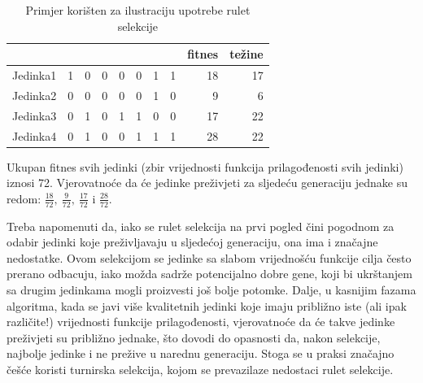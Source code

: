 \documentclass[a4paper, utf8, 11pt, colorlinks]{book}
\theoremstyle{definition}
\begin{document}
\begin{table}
	\centering
	\begin{tabular}{l|rrrrrrrrr}
		& \multicolumn{1}{l}{} & \multicolumn{1}{l}{} & \multicolumn{1}{l}{} & \multicolumn{1}{l}{} & \multicolumn{1}{l}{} & \multicolumn{1}{l}{} & \multicolumn{1}{l}{} & \multicolumn{1}{l}{fitnes} & \multicolumn{1}{l}{težine}  \\\hline
		Jedinka1 & 1                    & 0                    & 0                    & 0                    & 0                    & 1                    & 1                    & 18                         & 17                          \\
		Jedinka2 & 0                    & 0                    & 0                    & 0                    & 0                    & 1                    & 0                    & 9                          & 6                           \\
		Jedinka3 & 0                    & 1                    & 0                    & 1                    & 1                    & 0                    & 0                    & 17                         & 22                          \\
		Jedinka4 & 0                    & 1                    & 0                    & 0                    & 1                    & 1                    & 1                    & 28                         & 22      \\\hline                   
	\end{tabular}\caption{Primjer korišten za ilustraciju upotrebe rulet selekcije}
	\label{tab:rulet}
\end{table}
Ukupan fitnes svih jedinki (zbir vrijednosti funkcija prilagođenosti svih jedinki) iznosi 72. Vjerovatnoće da će jedinke preživjeti za sljedeću generaciju jednake su redom: $\frac{18}{72},\ \frac{9}{72},\ \frac{17}{72}$ i $\frac{28}{72}$. 

Treba napomenuti da, iako se rulet selekcija na prvi pogled čini pogodnom za odabir jedinki koje preživljavaju u sljedećoj generaciju, ona ima i značajne nedostatke. Ovom selekcijom se jedinke sa slabom vrijednošću funkcije cilja često prerano odbacuju, iako možda sadrže potencijalno dobre gene, koji bi ukrštanjem sa drugim jedinkama mogli proizvesti još bolje potomke. Dalje, u kasnijim fazama algoritma, kada se javi više kvalitetnih jedinki koje imaju približno iste (ali ipak različite!) vrijednosti funkcije prilagođenosti, vjerovatnoće da će takve jedinke preživjeti su približno jednake, što dovodi do opasnosti da, nakon selekcije, najbolje jedinke i ne prežive u narednu generaciju. Stoga se u praksi značajno češće koristi turnirska selekcija, kojom se prevazilaze nedostaci rulet selekcije.
\end{document}
